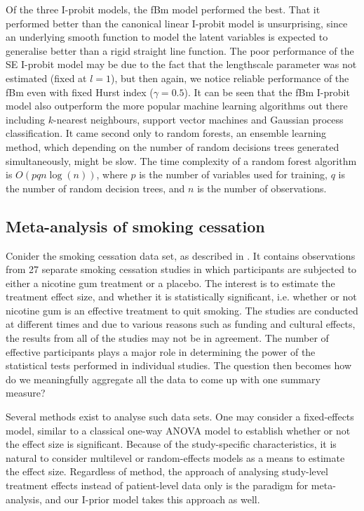 \documentclass[a4paper,showframe,11pt]{report}\usepackage[]{graphicx}\usepackage[]{color}
\begin{document}
Of the three I-probit models, the fBm model performed the best.
That it performed better than the canonical linear I-probit model is unsurprising, since an underlying smooth function to model the latent variables is expected to generalise better than a rigid straight line function.
The poor performance of the SE I-probit model may be due to the fact that the lengthscale parameter was not estimated (fixed at $l=1$), but then again, we notice reliable performance of the fBm even with fixed Hurst index ($\gamma = 0.5$).
It can be seen that the fBm I-probit model also outperform the more popular machine learning algorithms out there including $k$-nearest neighbours, support vector machines and Gaussian process classification.
It came second only to random forests, an ensemble learning method, which depending on the number of random decisions trees generated simultaneously, might be slow.
The time complexity of a random forest algorithm is $O(pqn\log(n))$, where $p$ is the number of variables used for training, $q$ is the number of random decision trees, and $n$ is the number of observations.

\subsection{Meta-analysis of smoking cessation}

Conider the smoking cessation data set, as described in \citet{skrondal2004generalized}.
It contains observations from 27 separate smoking cessation studies in which participants are subjected to either a nicotine gum treatment or a placebo.
The interest is to estimate the treatment effect size, and whether it is statistically significant, i.e. whether or not nicotine gum is an effective treatment to quit smoking.
The studies are conducted at different times and due to various reasons such as funding and cultural effects, the results from all of the studies may not be in agreement.
The number of effective participants plays a major role in determining the power of the statistical tests performed in individual studies.
The question then becomes how do we meaningfully aggregate all the data to come up with one summary measure?

Several methods exist to analyse such data sets.
One may consider a fixed-effects model, similar to a classical one-way ANOVA model to establish whether or not the effect size is significant.
Because of the study-specific characteristics, it is natural to consider multilevel or random-effects models as a means to estimate the effect size.
Regardless of method, the approach of analysing study-level treatment effects instead of patient-level data only is the paradigm for meta-analysis, and our I-prior model takes this approach as well.
\end{document}
